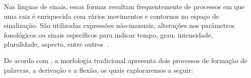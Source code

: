 Nas línguas de sinais, essas formas resultam frequentemente de processos em que uma raiz é enriquecida com vários movimentos e contornos no espaço de sinalização. São utilizadas expressões não-manuais, alterações nos parâmetros fonológicos ou sinais específicos para indicar tempo, grau, intensidade, pluralidade, aspecto, entre outros~\cite{klima-1975-wit-poetry-asl,quadros-2004-estudos-linguisticos}.

De acordo com , a morfologia tradicional apresenta dois processos de formação de palavras, a derivação e a flexão, os quais exploraremos a seguir:



